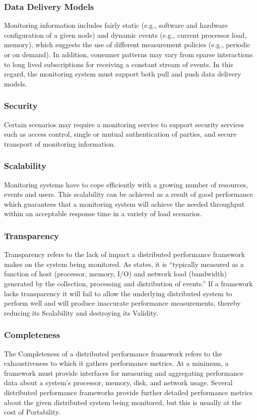\documentclass{beamer}
\begin{document}
\begin{frame}
\frametitle{Data Delivery Models}
Monitoring information includes fairly static (e.g., software and hardware configuration of a given node) and dynamic
events (e.g., current processor load, memory), which suggests the use of different measurement policies (e.g., periodic
or on demand). In addition, consumer patterns may vary from sparse interactions to long lived subscriptions for
receiving a constant stream of events. In this regard, the monitoring system must support both pull and push data
delivery models.
\end{frame}

\begin{frame}
\frametitle{Security}
Certain scenarios may require a monitoring service to support security services such as access control, single or mutual
authentication of parties, and secure transport of monitoring information.
\end{frame}

\begin{frame}
\frametitle{Scalability}
Monitoring systems have to cope efficiently with a growing number of resources, events and users. This scalability can
be achieved as a result of good performance which guarantees that a monitoring system will achieve the needed throughput
within an acceptable response time in a variety of load scenarios.
\end{frame}

\begin{frame}
\frametitle{Transparency}
Transparency refers to the lack of impact a distributed performance framework makes on the system being monitored. As
\cite{zanikolas2005} states, it is ``typically measured as a function of host (processor, memory, I/O) and network load
(bandwidth) generated by the collection, processing and distribution of events.'' If a framework lacks transparency it
will fail to allow the underlying distributed system to perform well and will produce inaccurate performance
measurements, thereby reducing its Scalability and destroying its Validity.
\end{frame}

\begin{frame}
\frametitle{Completeness}
The Completeness of a distributed performance framework refers to the exhaustiveness to which it gathers performance
metrics. At a minimum, a framework must provide interfaces for measuring and aggregating performance data about a
system's processor, memory, disk, and network usage. Several distributed performance frameworks provide further detailed
performance metrics about the given distributed system being monitored, but this is usually at the cost of Portability.
\end{frame}
\end{document}
